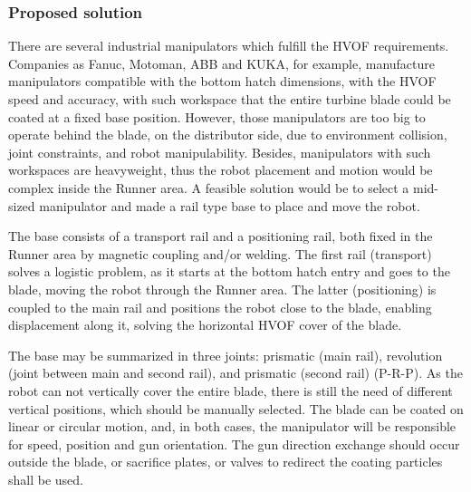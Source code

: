 \subsubsection{Proposed solution}\label{proj_manip}

There are several industrial manipulators which fulfill the HVOF requirements.
Companies as Fanuc, Motoman, ABB and KUKA, for example, manufacture manipulators
compatible with the bottom hatch dimensions, with the HVOF speed and accuracy,
with such workspace that the entire turbine blade could be coated at a fixed
base position. However, those manipulators are too big to operate behind the
blade, on the distributor side, due to environment collision, joint
constraints, and robot manipulability. Besides, manipulators with such
workspaces are heavyweight, thus the robot placement and motion would be complex
inside the Runner area. A feasible solution would be to select a
mid-sized manipulator and made a rail type base to place and move the robot.


The base consists of a transport rail and a positioning rail, both fixed
in the Runner area by magnetic coupling and/or welding. The first rail
(transport) solves a logistic problem, as it starts at the bottom hatch entry
and goes to the blade, moving the robot through the Runner area. The latter
(positioning) is coupled to the main rail and positions the robot close to the
blade, enabling displacement along it, solving the horizontal HVOF cover of the
blade.

The base may be summarized in three joints: prismatic (main rail), revolution
(joint between main and second rail), and prismatic (second rail) (P-R-P). As
the robot can not vertically cover the entire blade, there is still the need of
different vertical positions, which should be manually selected. The blade can
be coated on linear or circular motion, and, in both cases, the manipulator will
be responsible for speed, position and gun orientation. The gun direction
exchange should occur outside the blade, or sacrifice plates, or valves to
redirect the coating particles shall be used.

